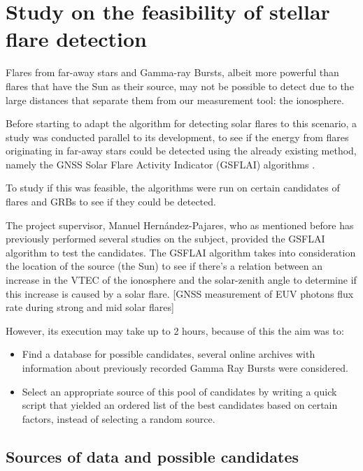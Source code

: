 \documentclass[12pt]{article}
\begin{document}
	
\section{Study on the feasibility of stellar flare detection}

Flares from far-away stars and Gamma-ray Bursts, albeit more powerful than flares that have the Sun as their source, may not be possible to detect due to the large distances that separate them from our measurement tool: the ionosphere.

Before starting to adapt the algorithm for detecting solar flares to this scenario, a study was conducted parallel to its development, to see if the energy from flares originating in far-away stars could be detected using the already existing method, namely the GNSS Solar Flare Activity Indicator (GSFLAI) algorithms \cite{hernandez2012gnss}.

To study if this was feasible, the algorithms were run on certain candidates of flares and GRBs to see if they could be detected.

The project supervisor, Manuel Hernández-Pajares, who as mentioned before has previously performed several studies on the subject, provided the GSFLAI algorithm to test the candidates. The GSFLAI algorithm takes into consideration the location of the source (the Sun) to see if there's a relation between an increase in the VTEC of the ionosphere and the solar-zenith angle to determine if this increase is caused by a solar flare. [GNSS measurement of EUV photons flux rate
during strong and mid solar flares]

However, its execution may take up to 2 hours, because of this the aim was to:

\begin{itemize}
	\item Find a database for possible candidates, several online archives with information about previously recorded Gamma Ray Bursts were considered.
	\item Select an appropriate source of this pool of candidates by writing a quick script that yielded an ordered list of the best candidates based on certain factors, instead of selecting a random source.
\end{itemize}

\subsection{Sources of data and possible candidates}
\end{document}
